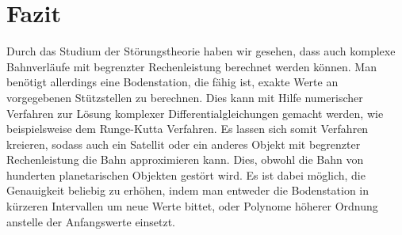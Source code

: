 \section{Fazit}
Durch das Studium der Störungstheorie haben wir gesehen, dass auch komplexe Bahnverläufe mit begrenzter Rechenleistung berechnet werden können. Man benötigt allerdings eine Bodenstation, die fähig ist, exakte Werte an vorgegebenen Stützstellen zu berechnen. Dies kann mit Hilfe numerischer Verfahren zur Lösung komplexer Differentialgleichungen gemacht werden, wie beispielsweise dem Runge-Kutta Verfahren. Es lassen sich somit Verfahren kreieren, sodass auch ein Satellit oder ein anderes Objekt mit begrenzter Rechenleistung die Bahn approximieren kann. Dies, obwohl die Bahn von hunderten planetarischen Objekten gestört wird. Es ist dabei möglich, die Genauigkeit beliebig zu erhöhen, indem man entweder die Bodenstation in kürzeren Intervallen um neue Werte bittet, oder Polynome höherer Ordnung anstelle der Anfangswerte einsetzt.